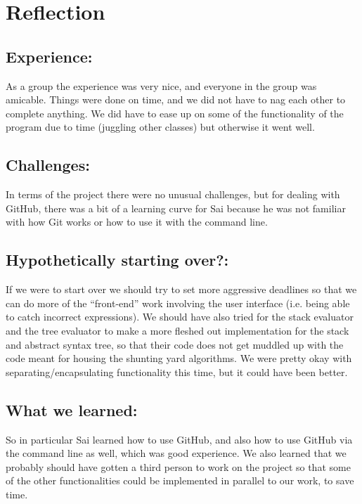 \documentclass[11pt]{article}
\begin{document}
\noindent\makebox[\linewidth]{\rule{19.1cm}{0.4pt}}

\section*{Reflection}

\subsection*{Experience:}
As a group the experience was very nice, and everyone in the group was amicable. Things were done on time, and we did not have to nag each other to complete anything. We did have to ease up on some of the functionality of the program due to time (juggling other classes) but otherwise it went well.

\subsection*{Challenges:}
In terms of the project there were no unusual challenges, but for dealing with GitHub, there was a bit of a learning curve for Sai because he was not familiar with how Git works or how to use it with the command line.

\subsection*{Hypothetically starting over?:}
If we were to start over we should try to set more aggressive deadlines so that we can do more of the ``front-end'' work involving the user interface (i.e. being able to catch incorrect expressions). We should have also tried for the stack evaluator and the tree evaluator to make a more fleshed out implementation for the stack and abstract syntax tree, so that their code does not get muddled up with the code meant for housing the shunting yard algorithms. We were pretty okay with separating/encapsulating functionality this time, but it could have been better.

\subsection*{What we learned:}
So in particular Sai learned how to use GitHub, and also how to use GitHub via the command line as well, which was good experience. We also learned that we probably should have gotten a third person to work on the project so that some of the other functionalities could be implemented in parallel to our work, to save time.
\end{document}
